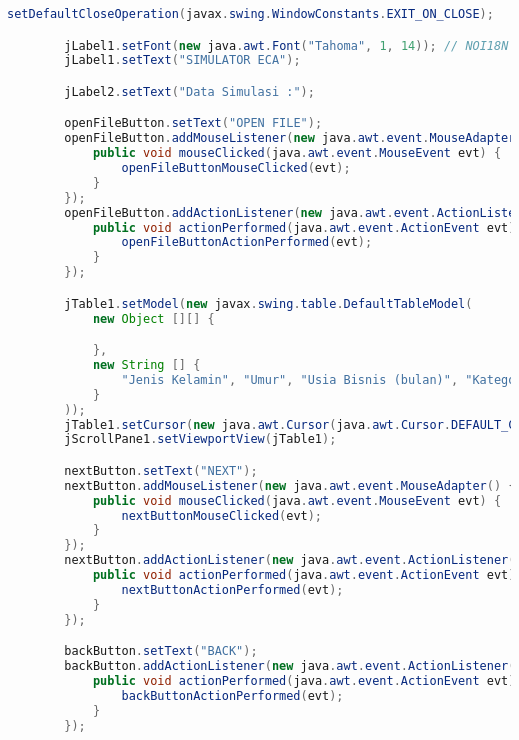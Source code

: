 \begin{lstlisting}[language=Java, caption=TampilanDataWirausaha.java]
        setDefaultCloseOperation(javax.swing.WindowConstants.EXIT_ON_CLOSE);

        jLabel1.setFont(new java.awt.Font("Tahoma", 1, 14)); // NOI18N
        jLabel1.setText("SIMULATOR ECA");

        jLabel2.setText("Data Simulasi :");

        openFileButton.setText("OPEN FILE");
        openFileButton.addMouseListener(new java.awt.event.MouseAdapter() {
            public void mouseClicked(java.awt.event.MouseEvent evt) {
                openFileButtonMouseClicked(evt);
            }
        });
        openFileButton.addActionListener(new java.awt.event.ActionListener() {
            public void actionPerformed(java.awt.event.ActionEvent evt) {
                openFileButtonActionPerformed(evt);
            }
        });

        jTable1.setModel(new javax.swing.table.DefaultTableModel(
            new Object [][] {

            },
            new String [] {
                "Jenis Kelamin", "Umur", "Usia Bisnis (bulan)", "Kategori", "Sub Kategori", "Pendidikan", "Lokasi", "Pendapatan", "Level", "Point"
            }
        ));
        jTable1.setCursor(new java.awt.Cursor(java.awt.Cursor.DEFAULT_CURSOR));
        jScrollPane1.setViewportView(jTable1);

        nextButton.setText("NEXT");
        nextButton.addMouseListener(new java.awt.event.MouseAdapter() {
            public void mouseClicked(java.awt.event.MouseEvent evt) {
                nextButtonMouseClicked(evt);
            }
        });
        nextButton.addActionListener(new java.awt.event.ActionListener() {
            public void actionPerformed(java.awt.event.ActionEvent evt) {
                nextButtonActionPerformed(evt);
            }
        });

        backButton.setText("BACK");
        backButton.addActionListener(new java.awt.event.ActionListener() {
            public void actionPerformed(java.awt.event.ActionEvent evt) {
                backButtonActionPerformed(evt);
            }
        });


\end{lstlisting}
